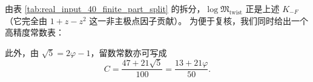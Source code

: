 \begin{remark}\label{rem:real-input-40-artin-sign-mertens-value}
由表 \ref{tab:real_input_40_finite_part_split} 的拆分，\(\log\mathfrak{M}_{\mathrm{twist}}\) 正是上述 \(K_{-F}\)（它完全由 \(1+z-z^2\) 这一非主极点因子贡献）。
为便于复核，我们同时给出一个高精度常数表：

\end{remark}

此外，由 $\sqrt5=2\varphi-1$，留数常数亦可写成
\[
C=\frac{47+21\sqrt5}{100}=\frac{13+21\varphi}{50}.
\]
